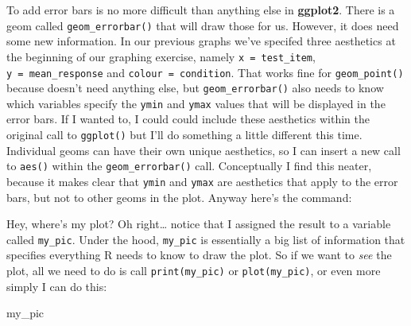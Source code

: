 \documentclass[]{book}
\newenvironment{Shaded}{\begin{snugshade}}{\end{snugshade}}
\newcommand{\CommentTok}[1]{\textcolor[rgb]{0.56,0.35,0.01}{\textit{#1}}}
\newcommand{\DataTypeTok}[1]{\textcolor[rgb]{0.13,0.29,0.53}{#1}}
\newcommand{\KeywordTok}[1]{\textcolor[rgb]{0.13,0.29,0.53}{\textbf{#1}}}
\newcommand{\NormalTok}[1]{#1}
\newcommand{\OperatorTok}[1]{\textcolor[rgb]{0.81,0.36,0.00}{\textbf{#1}}}
\newcommand{\StringTok}[1]{\textcolor[rgb]{0.31,0.60,0.02}{#1}}
\begin{document}
To add error bars is no more difficult than anything else in \textbf{ggplot2}. There is a geom called \texttt{geom\_errorbar()} that will draw those for us. However, it does need some new information. In our previous graphs we've specifed three aesthetics at the beginning of our graphing exercise, namely \texttt{x\ =\ test\_item}, \texttt{y\ =\ mean\_response} and \texttt{colour\ =\ condition}. That works fine for \texttt{geom\_point()} because doesn't need anything else, but \texttt{geom\_errorbar()} also needs to know which variables specify the \texttt{ymin} and \texttt{ymax} values that will be displayed in the error bars. If I wanted to, I could could include these aesthetics within the original call to \texttt{ggplot()} but I'll do something a little different this time. Individual geoms can have their own unique aesthetics, so I can insert a new call to \texttt{aes()} within the \texttt{geom\_errorbar()} call. Conceptually I find this neater, because it makes clear that \texttt{ymin} and \texttt{ymax} are aesthetics that apply to the error bars, but not to other geoms in the plot. Anyway here's the command:

\begin{Shaded}
\end{Shaded}

Hey, where's my plot? Oh right\ldots{} notice that I assigned the result to a variable called \texttt{my\_pic}. Under the hood, \texttt{my\_pic} is essentially a big list of information that specifies everything R needs to know to draw the plot. So if we want to \emph{see} the plot, all we need to do is call \texttt{print(my\_pic)} or \texttt{plot(my\_pic)}, or even more simply I can do this:

\begin{Shaded}
\begin{Highlighting}[]
\NormalTok{my_pic}
\end{Highlighting}
\end{Shaded}
\end{document}
